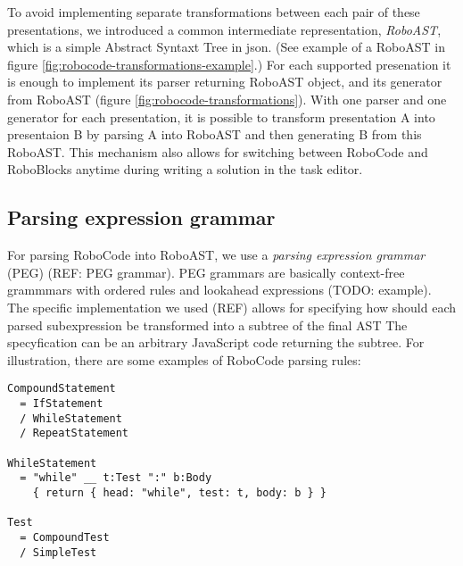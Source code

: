 To avoid implementing separate transformations between each pair of these
presentations, we introduced a common intermediate representation,
\emph{RoboAST}, which is a simple Abstract Syntaxt Tree in json.
(See example of a RoboAST in figure \ref{fig:robocode-transformations-example}.)
For each supported presenation it is enough to implement
its parser returning RoboAST object, and
its generator from RoboAST (figure \ref{fig:robocode-transformations}).
With one parser and one generator for each presentation,
it is possible to transform presentation A
into presentaion B by parsing A into RoboAST and
then generating B from this RoboAST.
This mechanism also allows for switching between RoboCode and RoboBlocks
anytime during writing a solution in the task editor.




\subsection{Parsing expression grammar}

For parsing RoboCode into RoboAST, we use a \emph{parsing expression grammar}
(PEG) (REF: PEG grammar).
PEG grammars are basically context-free grammmars with ordered rules
and lookahead expressions (TODO: example).
The specific implementation we used (REF) allows for specifying how should each
parsed subexpression be transformed into a subtree of the final AST
The specyfication can be an arbitrary JavaScript code returning the subtree.
For illustration, there are some examples of RoboCode parsing rules:

\begin{lstlisting}
CompoundStatement
  = IfStatement
  / WhileStatement
  / RepeatStatement

WhileStatement
  = "while" __ t:Test ":" b:Body
    { return { head: "while", test: t, body: b } }

Test
  = CompoundTest
  / SimpleTest
\end{lstlisting}

